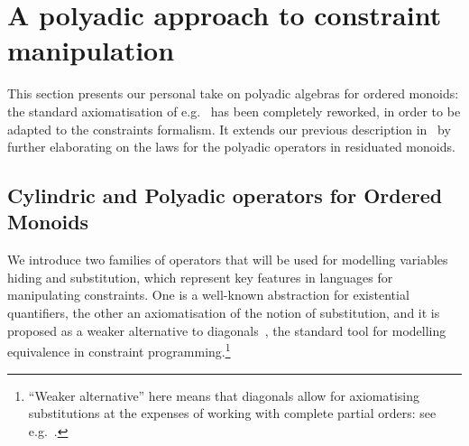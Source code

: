 \documentclass[preprint,12pt]{elsarticle}
\newtheorem{example}{Example}
\newcommand{\comment}[1]{}
\def\odiv{\, {\ominus\hspace{-7.7pt} \div} \,}
\begin{document}
\comment{
	\begin{example}
		\label{notdistr}
		Let us consider the monoid $S = \langle \{p,u,n,t\}, \otimes_s, u \rangle$ (with $t$ the top 
		of three otherwise unrelated elements): 
		$p$ and $n$ intuitively represent the sign of an integer, $t$ tells us that 
		the sign cannot be determined, $u$ is the zero
		and $\otimes_s$ (which is idempotent) tells us the sign of the addition of two integers, so that 
		for all elements $x$ we have
		\[x \otimes_s x = u \otimes_s x = x \mbox{  and  } t \otimes_s x = p \otimes_s n = t\]
		We now add the bottom, in order to obtain a complete lattice.
		The $\otimes_s$ is extended in the expected way,  so that $\bot$ is absorbing.
		Intuitively, $\bot$ states that an element is unsigned:
		a pattern the reader familiar with abstract interpretation formalisms will recognise.
		
		The resulting semi-lattice monoid is residuated, with $\odiv$ defined as
		
		$$x \odiv y = \bigg \{\begin{array}{ll}
		t & y \leq x \\
		\bot & \ otherwise
		\end{array}$$
		Thus, $\odiv$ does not distribute, since 
		$\bigvee \{p \odiv n, u \odiv n\}  = \bot < \bigvee \{p, u\} \odiv n = t \odiv n = t$.
	\end{example}
}

\section{A polyadic approach to constraint manipulation}\label{sec:newconstraint}

This section presents our personal take on polyadic algebras for ordered monoids:
the standard axiomatisation of e.g.~\cite{sagi2013} has been completely 
reworked, in order to be adapted to the constraints formalism.
%
It extends our previous description in~\cite{festcatuscia} by 
further elaborating on the laws for the polyadic operators in residuated monoids.

\subsection{Cylindric and Polyadic operators for Ordered Monoids}
\label{cypo}
We  introduce two families of operators 
that will be used
for modelling variables hiding and substitution, which represent
key features in languages for manipulating constraints.
%
One is a well-known abstraction for existential quantifiers,
the other an axiomatisation of the notion of
substitution, and it is proposed as a weaker  alternative 
to diagonals~\cite{popl91}, the standard tool for modelling 
equivalence in constraint programming.\footnote{``Weaker 
	alternative'' here means that diagonals allow for axiomatising
	substitutions at the expenses of working with complete
	partial orders: see e.g.~\cite[Definition 11]{jlamp17}.}
%
\end{document}
